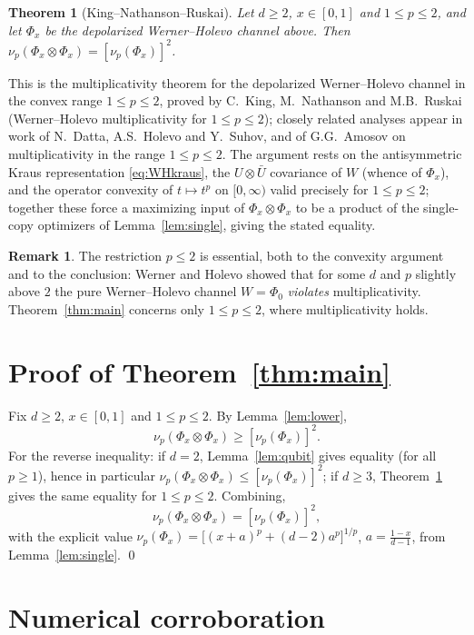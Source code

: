 \documentclass{amsart}
\newtheorem{theorem}{Theorem}
\theoremstyle{definition}
\newtheorem{remark}{Remark}
\begin{document}
\begin{theorem}[King--Nathanson--Ruskai]\label{thm:knr}
Let $d\ge2$, $x\in[0,1]$ and $1\le p\le2$, and let $\Phi_x$ be the depolarized
Werner--Holevo channel above. Then
$\nu_p(\Phi_x\otimes\Phi_x)=[\nu_p(\Phi_x)]^{2}$.
\end{theorem}

This is the multiplicativity theorem for the depolarized Werner--Holevo channel
in the convex range $1\le p\le 2$, proved by C.~King, M.~Nathanson and
M.B.~Ruskai (Werner--Holevo multiplicativity for $1\le p\le 2$); closely related
analyses appear in work of N.~Datta, A.S.~Holevo and Y.~Suhov, and of
G.G.~Amosov on multiplicativity in the range $1\le p\le2$. The argument rests on
the antisymmetric Kraus representation \eqref{eq:WHkraus}, the $U\otimes\bar U$
covariance of $W$ (whence of $\Phi_x$), and the operator convexity of
$t\mapsto t^{p}$ on $[0,\infty)$ valid precisely for $1\le p\le2$; together these
force a maximizing input of $\Phi_x\otimes\Phi_x$ to be a product of the
single-copy optimizers of Lemma~\ref{lem:single}, giving the stated equality.

\begin{remark}
The restriction $p\le2$ is essential, both to the convexity argument and to the
conclusion: Werner and Holevo showed that for some $d$ and $p$ slightly above
$2$ the pure Werner--Holevo channel $W=\Phi_0$ \emph{violates} multiplicativity.
Theorem~\ref{thm:main} concerns only $1\le p\le2$, where multiplicativity holds.
\end{remark}

\section{Proof of Theorem~\ref{thm:main}}

Fix $d\ge2$, $x\in[0,1]$ and $1\le p\le2$. By Lemma~\ref{lem:lower},
\[
\nu_p(\Phi_x\otimes\Phi_x)\ge[\nu_p(\Phi_x)]^{2}.
\]
For the reverse inequality: if $d=2$, Lemma~\ref{lem:qubit} gives equality (for
all $p\ge1$), hence in particular $\nu_p(\Phi_x\otimes\Phi_x)\le[\nu_p(\Phi_x)]^2$;
if $d\ge3$, Theorem~\ref{thm:knr} gives the same equality for $1\le p\le2$.
Combining,
\[
\nu_p(\Phi_x\otimes\Phi_x)=[\nu_p(\Phi_x)]^{2},
\]
with the explicit value
$\nu_p(\Phi_x)=\bigl[(x+a)^{p}+(d-2)a^{p}\bigr]^{1/p}$, $a=\tfrac{1-x}{d-1}$,
from Lemma~\ref{lem:single}. \qed

\section{Numerical corroboration}
\end{document}
